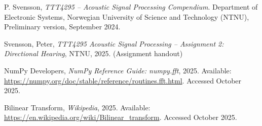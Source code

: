 
\begin{thebibliography}{9}

P. Svensson,
\textit{TTT4295 -- Acoustic Signal Processing Compendium}.
Department of Electronic Systems, Norwegian University of Science and Technology (NTNU), Preliminary version, September 2024.


Svensson, Peter, \emph{TTT4295 Acoustic Signal Processing – Assignment 2: Directional Hearing}, NTNU, 2025. (Assignment handout)

NumPy Developers, \emph{NumPy Reference Guide: numpy.fft}, 2025. Available: \url{https://numpy.org/doc/stable/reference/routines.fft.html}. Accessed October 2025.

Bilinear Transform, \emph{Wikipedia}, 2025. Available: \url{https://en.wikipedia.org/wiki/Bilinear_transform}. Accessed October 2025.
\end{thebibliography}
